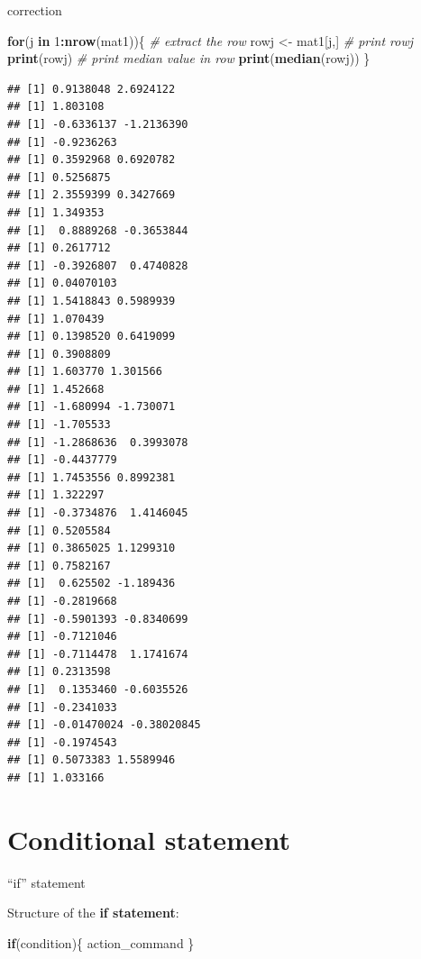 \documentclass[]{book}
\newenvironment{Shaded}{\begin{snugshade}}{\end{snugshade}}
\newcommand{\CommentTok}[1]{\textcolor[rgb]{0.56,0.35,0.01}{\textit{#1}}}
\newcommand{\ControlFlowTok}[1]{\textcolor[rgb]{0.13,0.29,0.53}{\textbf{#1}}}
\newcommand{\DecValTok}[1]{\textcolor[rgb]{0.00,0.00,0.81}{#1}}
\newcommand{\KeywordTok}[1]{\textcolor[rgb]{0.13,0.29,0.53}{\textbf{#1}}}
\newcommand{\NormalTok}[1]{#1}
\newcommand{\OperatorTok}[1]{\textcolor[rgb]{0.81,0.36,0.00}{\textbf{#1}}}
\newcommand{\StringTok}[1]{\textcolor[rgb]{0.31,0.60,0.02}{#1}}
\begin{document}
correction

\begin{Shaded}
\begin{Highlighting}[]
\ControlFlowTok{for}\NormalTok{(j }\ControlFlowTok{in} \DecValTok{1}\OperatorTok{:}\KeywordTok{nrow}\NormalTok{(mat1))\{}
    \CommentTok{# extract the row}
\NormalTok{    rowj <-}\StringTok{ }\NormalTok{mat1[j,]}
    \CommentTok{# print rowj}
    \KeywordTok{print}\NormalTok{(rowj)}
    \CommentTok{# print median value in row}
    \KeywordTok{print}\NormalTok{(}\KeywordTok{median}\NormalTok{(rowj))}
\NormalTok{\}       }
\end{Highlighting}
\end{Shaded}

\begin{verbatim}
## [1] 0.9138048 2.6924122
## [1] 1.803108
## [1] -0.6336137 -1.2136390
## [1] -0.9236263
## [1] 0.3592968 0.6920782
## [1] 0.5256875
## [1] 2.3559399 0.3427669
## [1] 1.349353
## [1]  0.8889268 -0.3653844
## [1] 0.2617712
## [1] -0.3926807  0.4740828
## [1] 0.04070103
## [1] 1.5418843 0.5989939
## [1] 1.070439
## [1] 0.1398520 0.6419099
## [1] 0.3908809
## [1] 1.603770 1.301566
## [1] 1.452668
## [1] -1.680994 -1.730071
## [1] -1.705533
## [1] -1.2868636  0.3993078
## [1] -0.4437779
## [1] 1.7453556 0.8992381
## [1] 1.322297
## [1] -0.3734876  1.4146045
## [1] 0.5205584
## [1] 0.3865025 1.1299310
## [1] 0.7582167
## [1]  0.625502 -1.189436
## [1] -0.2819668
## [1] -0.5901393 -0.8340699
## [1] -0.7121046
## [1] -0.7114478  1.1741674
## [1] 0.2313598
## [1]  0.1353460 -0.6035526
## [1] -0.2341033
## [1] -0.01470024 -0.38020845
## [1] -0.1974543
## [1] 0.5073383 1.5589946
## [1] 1.033166
\end{verbatim}

\hypertarget{conditional-statement}{%
\chapter{Conditional statement}\label{conditional-statement}}

``if'' statement

Structure of the \textbf{if statement}:

\begin{Shaded}
\begin{Highlighting}[]
\ControlFlowTok{if}\NormalTok{(condition)\{}
\NormalTok{    action_command}
\NormalTok{\}}
\end{Highlighting}
\end{Shaded}
\end{document}
